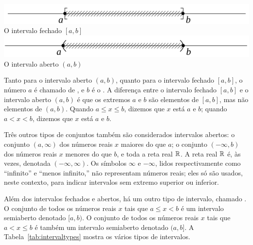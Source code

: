 {
	\includegraphics{closedinter}\\
	O intervalo fechado $[a, b]$\\[\baselineskip]
	\includegraphics{openinter}\\
	O intervalo aberto $(a, b)$
}

Tanto para o intervalo aberto $(a, b)$, quanto para o intervalo
fechado $[a, b]$, o número $a$ é chamado de
,
e $b$ é o . A diferença entre o
intervalo fechado $[a, b]$ e o intervalo aberto $(a, b)$ é que os extremos $a$
e $b$ são elementos de $[a, b]$, mas não elementos de $(a, b)$. Quando
$a \le x \le b$, dizemos que $x$ está  $a$ e $b$; quando
$a < x < b$, dizemos que $x$ está  $a$ e $b$.

Três outros tipos de conjuntos também são considerados intervalos
abertos: o conjunto $(a, \infty)$ dos números reais $x$ maiores do que $a$;
o conjunto $(-\infty, b)$ dos números reais $x$ menores do que $b$,
e toda a reta real $\mathbb{R}$. A reta real $\mathbb{R}$ é, às vezes, denotada
$(-\infty, \infty)$. Os símbolos $\infty$ e $-\infty$, lidos respectivamente
como ``infinito''  e ``menos infinito,'' não representam números reais; eles
só são usados, neste contexto, para indicar intervalos sem extremo
superior ou inferior.

Além dos intervalos fechados e abertos, há um outro tipo de intervalo,
chamado . O conjunto
de todos os números
reais $x$ tais que $a \le x < b$ é um intervalo semiaberto denotado
$[a, b)$. O conjunto de todos os números reais $x$ tais que $a < x \le b$
é também um intervalo semiaberto denotado $(a, b]$.
A Tabela~\ref{tab:intervaltypes} mostra os vários tipos de intervalos.

